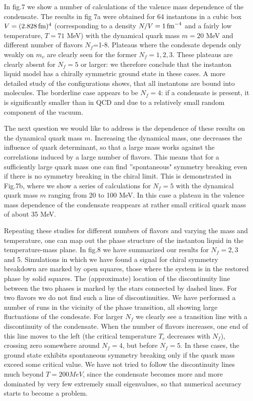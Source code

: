   In fig.7 we show a number of calculations of the valence mass dependence
of the condensate. The results in fig 7a were obtained for 64 instantons
in a cubic box $V=(2.828\,{\rm fm})^4$ (corresponding to a density $N/V
=1\,{\rm fm}^{-4}$ and a fairly low temperature, $T=71$ MeV) with the
dynamical quark mass $m=20$ MeV and different number of flavors $N_f$=1-8.
Plateaus where the condesate depends only weakly on $m_v$ are clearly
seen for the former $N_f=1,2,3$. These plateaus are clearly absent for
$N_f=5$ or larger: we therefore conclude that the instanton liquid
model has a chirally symmetric ground state in these cases. A more
detailed study of the configurations shows, that all instantons are
bound into molecules. The borderline case appears to be $N_f=4$: if
a condensate is present, it is significantly smaller than in QCD and
due to a relatively small random component of the vacuum.

    The next question we would like to address is the dependence of these
results on the dynamical quark mass $m$. Increasing the dynamical mass, one
decreases the influence of quark determinant, so that a large mass works
against the correlations induced by a large number of flavors. This means
that for a sufficiently large quark mass one can find ''spontaneous"
symmetry breaking even if there is no symmetry breaking in the chiral
limit. This is demonstrated in Fig.7b, where we show a series of calculations
for $N_f=5$ with the dynamical quark mass $m$ ranging from 20 to 100 MeV.
In this case a plateau in the valence mass dependence of the condensate
reappears at rather small critical quark mass of about 35 MeV.

   Repeating these studies for different numbers of flavors and
varying the mass and temperature, one can map out the phase structure
of the instanton liquid in the temperature-mass plane. In fig.8 we
have summarized our results for $N_f=2,3$ and 5. Simulations in which
we have found a signal for chiral symmetry breakdown are marked by
open squares, those where the system is in the restored phase by
solid squares. The (approximate) location of the discontinuity line
between the two phases is marked by the stars connected by dashed
lines. For two flavors we do not find such a line of discontinuities.
We have performed a number of runs in the vicinity of the phase
transition, all showing large fluctuations of the condesate. For
larger $N_f$ we clearly see a transition line with a discontinuity
of the condensate. When the number of flavors increases, one end of
this line moves to the left (the critical temperature $T_c$ decreases
with $N_f$), crossing zero somewhere around $N_f=4$, but before $N_f=5$.
In these cases, the ground state exhibits spontaneous symmetry breaking
only if the quark mass exceed some critical value. We have not tried
to follow the discontinuity lines much beyond $T=200 MeV$, since the
condensate becomes more and more dominated by very few extremely small
eigenvalues, so that numerical accuracy starts to become a problem.

